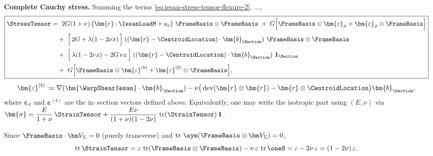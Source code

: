 \begin{Quote}
\textbf{Complete Cauchy stress.}
Summing the terms \eqref{eq:iesan-stress-tensor-flexure-2}, ...,
\[
\boxed{
\begin{aligned}
\StressTensor
&=\ 2G(1+\nu)\,\big(\bm{r}\cdot\IesanLoadM+a_\varepsilon\big)\ \FrameBasis\otimes\FrameBasis
\;+\;G\Big[\FrameBasis\otimes\bm{\varepsilon}_{\vartheta}+\bm{\varepsilon}_{\vartheta}\otimes\FrameBasis\Big]\\[2pt]
&\quad+\ \Big[\,2G+\lambda(1-2\nu x)\,\Big]\;((\bm{r}-\CentroidLocation)\cdot\bm{b}_{\Section})\ \FrameBasis\otimes\FrameBasis\\[2pt]
&\quad+\ \Big[\,\lambda(1-2\nu x)-2G\,\nu x\,\Big]\;((\bm{r}-\CentroidLocation)\cdot\bm{b}_{\Section})\ \mathbf{1}_\Section \\[2pt]
&\quad+\ G\Big[\FrameBasis\otimes\bm{\varepsilon}^{(b)}+\bm{\varepsilon}^{(b)}\otimes\FrameBasis\Big],
\end{aligned}}
\]
\[
\begin{aligned}
\bm{\varepsilon}^{(b)}&:=\nabla (\bm{\WarpShearIesan}\cdot\bm{b}_{\Section})
-\nu\big(\operatorname{dev}(\bm{r}\otimes\bm{r})-\bm{r}\otimes\CentroidLocation\big)\bm{b}_{\Section}, \\
\end{aligned}
\]
where \(\bm{\varepsilon}_{\vartheta}\) and \(\bm{\varepsilon}^{(b)}\) are the in–section vectors defined above. 
Equivalently, one may write the isotropic part using \((E,\nu)\) via
\(\displaystyle \bm{\sigma}=\frac{E}{1+\nu}\,\StrainTensor
+\frac{E\nu}{(1+\nu)(1-2\nu)}\,\operatorname{tr}(\StrainTensor)\,\mathbf{1}\).

\end{Quote}



Since $\FrameBasis\cdot\bm V_\Sigma=0$ (purely transverse) and $\operatorname{tr}\,\sym(\FrameBasis\otimes\bm V_\Sigma)=0$,
\[
\operatorname{tr}\StrainTensor
= \varepsilon\,\operatorname{tr}(\FrameBasis\otimes\FrameBasis)
- \nu\,\varepsilon\,\operatorname{tr}\oneS
= \varepsilon - 2\nu\,\varepsilon
= (1-2\nu)\,\varepsilon.
\]


